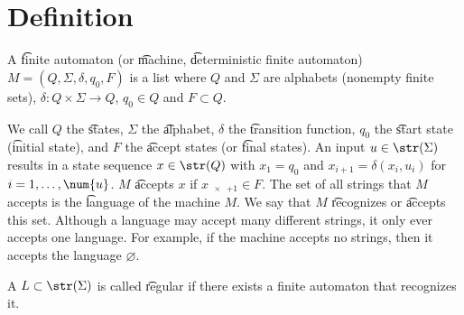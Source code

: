
\section*{Definition}

A \t{finite automaton} (or \t{machine}, \t{deterministic finite automaton}) $M = (Q, \Sigma , \delta , q_0, F)$ is a list where $Q$ and $\Sigma $ are alphabets (nonempty finite sets), $\delta : Q \times  \Sigma  \to Q$, $q_0 \in Q$ and $F \subset Q$.

We call $Q$ the \t{states}, $\Sigma $ the \t{alphabet}, $\delta $ the \t{transition function}, $q_0$ the \t{start state} (\t{initial state}), and $F$ the \t{accept states} (or \t{final states}).
An input $u \in \str(\Sigma )$ results in a state sequence $x \in \str(Q)$ with $x_1 = q_0$ and $x_{i+1} = \delta (x_i, u_i)$ for $i = 1, \dots , \num{u}$.
$M$ \t{accepts} $x$ if $x_{\num{x}+1} \in F$.
The set of all strings that $M$ accepts is the \t{language} of the machine $M$.
We say that $M$ \t{recognizes} or \t{accepts} this set.
Although a language may accept many different strings, it only ever accepts one language.
For example, if the machine accepts no strings, then it accepts the language $\varnothing$.

A $L \subset \str(\Sigma )$ is called \t{regular} if there exists a finite automaton that recognizes it.

\blankpage